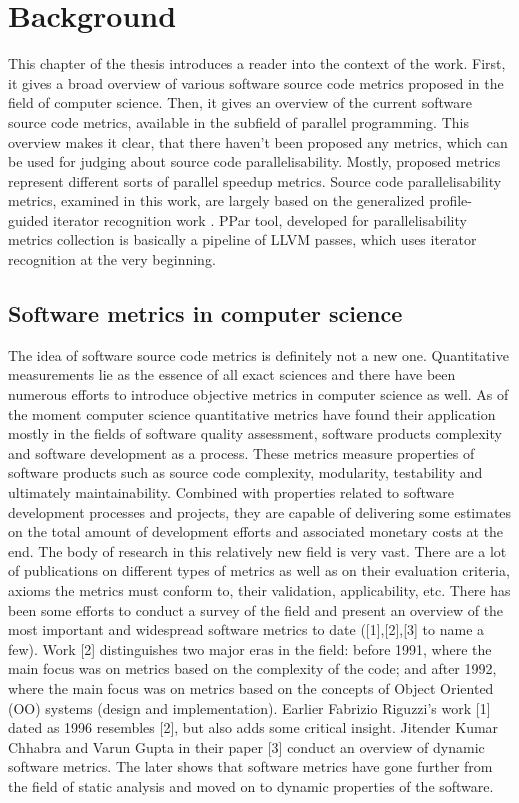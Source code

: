 \chapter{Background} \label{backgroud}
\qquad This chapter of the thesis introduces a reader into the context of the work. First, it gives a broad overview of various software source code metrics proposed in the field of computer science. Then, it gives an overview of the current software source code metrics, available in the subfield of parallel programming. This overview makes it clear, that there haven't been proposed any metrics, which can be used for judging about source code parallelisability. Mostly, proposed metrics represent different sorts of parallel speedup metrics. \newline \null\qquad Source code parallelisability metrics, examined in this work, are largely based on the generalized profile-guided iterator recognition work \cite{iterator-recognition-paper}. PPar tool, developed for parallelisability metrics collection is basically a pipeline of LLVM passes, which uses iterator recognition at the very beginning.

\section{Software metrics in computer science} \label{background-software-metrics-in-cs}
\qquad The idea of software source code metrics is definitely not a new one. Quantitative measurements lie as the essence of all exact sciences and there have been numerous efforts to introduce objective metrics in computer science as well. As of the moment computer science quantitative metrics have found their
application mostly in the fields of software quality assessment, software products complexity and software development as a process. These metrics measure
properties of software products such as source code complexity, modularity,
testability and ultimately maintainability. Combined with properties related to
software development processes and projects, they are capable of delivering some
estimates on the total amount of development efforts and associated monetary costs at the end. The body of research in this relatively new field is very vast. There are a lot of publications on different types of metrics as well as on their evaluation criteria, axioms the metrics must conform to, their validation, applicability, etc. There has been some efforts to conduct a survey of the field and present an overview of the most important and widespread software metrics to date ([1],[2],[3] to name a few). Work [2] distinguishes two major eras in the field: before 1991, where the main focus was on metrics based on the complexity of the code; and after 1992, where the main focus was on metrics based on the concepts of Object Oriented (OO) systems (design and implementation). Earlier Fabrizio Riguzzi's work [1] dated as 1996 resembles
[2], but also adds some critical insight. Jitender Kumar Chhabra and Varun Gupta in their paper [3] conduct an overview of dynamic software metrics. The later shows that software metrics have gone further from the field of static analysis and moved on to dynamic properties of the software.

